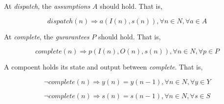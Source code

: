


At \emph{dispatch}, the \emph{assumptions} $A$ should hold. That is,

\begin{equation} 
\label{eqn:assumption}
dispatch(n) \Rightarrow a(I(n), s(n)), \forall n\in N, \forall a \in A
\end{equation}

At \emph{complete}, the \emph{gurarantees} $P$ should hold. That is,

\begin{equation} 
\label{eqn:guarantee}
complete(n) \Rightarrow p(I(n), O(n), s(n)), \forall n\in N, \forall p \in P
\end{equation}

A compoent holds its state and output between \emph{complete}. That is,

\begin{equation} 
\label{eqn:outputhold}
\lnot complete(n) \Rightarrow y(n) = y(n-1), \forall n \in N, \forall y \in Y
\end{equation}

\begin{equation} 
\label{eqn:statehold}
\lnot complete(n) \Rightarrow s(n) = s(n-1), \forall n \in N, \forall s \in S
\end{equation}


